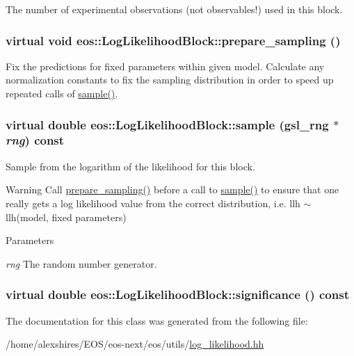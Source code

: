 The number of experimental observations (not observables!) used in this block. \hypertarget{classeos_1_1LogLikelihoodBlock_abb412e8a3fde0945f940ddcd6f79e68c}{
\subsubsection[{prepare\_\-sampling}]{\setlength{\rightskip}{0pt plus 5cm}virtual void eos::LogLikelihoodBlock::prepare\_\-sampling ()}}
\label{classeos_1_1LogLikelihoodBlock_abb412e8a3fde0945f940ddcd6f79e68c}
Fix the predictions for fixed parameters within given model. Calculate any normalization constants to fix the sampling distribution in order to speed up repeated calls of \hyperlink{classeos_1_1LogLikelihoodBlock_ad0669d109d0d004cc5674c739fb41d7a}{sample()}. \hypertarget{classeos_1_1LogLikelihoodBlock_ad0669d109d0d004cc5674c739fb41d7a}{
\subsubsection[{sample}]{\setlength{\rightskip}{0pt plus 5cm}virtual double eos::LogLikelihoodBlock::sample (gsl\_\-rng $\ast$ {\em rng}) const}}
\label{classeos_1_1LogLikelihoodBlock_ad0669d109d0d004cc5674c739fb41d7a}
Sample from the logarithm of the likelihood for this block. \begin{DoxyWarning}{Warning}
Call \hyperlink{classeos_1_1LogLikelihoodBlock_abb412e8a3fde0945f940ddcd6f79e68c}{prepare\_\-sampling()} before a call to \hyperlink{classeos_1_1LogLikelihoodBlock_ad0669d109d0d004cc5674c739fb41d7a}{sample()} to ensure that one really gets a log likelihood value from the correct distribution, i.e. llh $\sim$ llh(model, fixed parameters)
\end{DoxyWarning}

\begin{DoxyParams}{Parameters}
\item[{\em rng}]The random number generator. \end{DoxyParams}
\hypertarget{classeos_1_1LogLikelihoodBlock_a52c12058a07b20a5b910dea8972f5282}{
\subsubsection[{significance}]{\setlength{\rightskip}{0pt plus 5cm}virtual double eos::LogLikelihoodBlock::significance () const}}
\label{classeos_1_1LogLikelihoodBlock_a52c12058a07b20a5b910dea8972f5282}


The documentation for this class was generated from the following file:\begin{DoxyCompactItemize}
\item 
/home/alexshires/EOS/eos-\/next/eos/utils/\hyperlink{log__likelihood_8hh}{log\_\-likelihood.hh}\end{DoxyCompactItemize}
